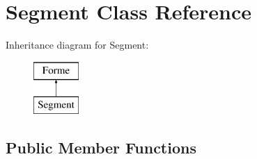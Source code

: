 \hypertarget{class_segment}{}\section{Segment Class Reference}
\label{class_segment}
Inheritance diagram for Segment\+:\begin{figure}[H]
\begin{center}
\leavevmode
\includegraphics[height=2.000000cm]{class_segment}
\end{center}
\end{figure}
\subsection*{Public Member Functions}
